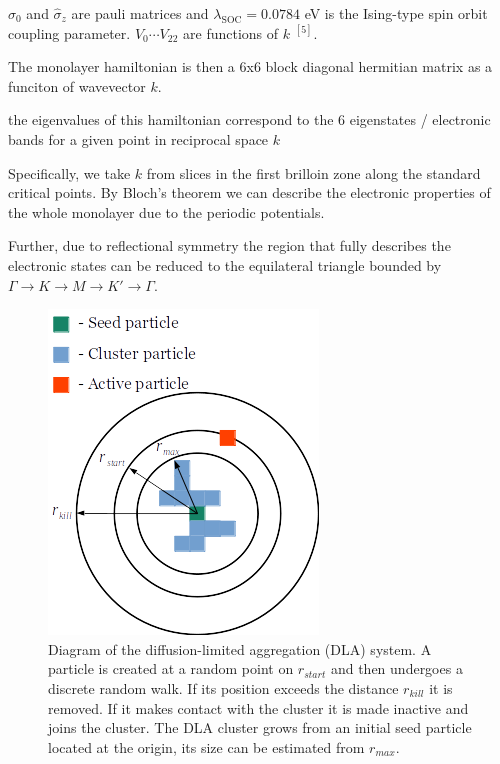 \documentclass[10pt, twocolumn]{article} %
\begin{document}
  \item $\hat{\sigma}_0$ and $\hat{\sigma}_z$ are pauli matrices and $\lambda_{\text{SOC}}=0.0784$ eV is the Ising-type spin orbit coupling parameter. $V_0 \cdots V_{22}$ are functions of $k$ $^{[5]}$.

    The monolayer hamiltonian is then a 6x6 block diagonal hermitian matrix as a funciton of wavevector $k$.

    the eigenvalues of this hamiltonian correspond to the 6 eigenstates / electronic bands for a given point in reciprocal space $k$ 

  Specifically, we take $k$ from slices in the first brilloin zone along the standard critical points. By Bloch's theorem we can describe the electronic properties of the whole monolayer due to the periodic potentials.

  Further, due to reflectional symmetry the region that fully describes the electronic states can be reduced to the equilateral triangle bounded by $\Gamma \rightarrow K \rightarrow M \rightarrow K' \rightarrow \Gamma$.

\begin{figure}[t]
\centering
\includegraphics[width=0.95\columnwidth]{DLA_diagram.png}
  \caption{
    Diagram of the diffusion-limited aggregation (DLA) system. A particle is created at a random point on $r_{start}$ and then undergoes a discrete random walk. If its position exceeds the distance $r_{kill}$ it is removed. If it makes contact with the cluster it is made inactive and joins the cluster. The DLA cluster grows from an initial seed particle located at the origin, its size can be estimated from $r_{max}$.
  }
  \label{DLA_diagram}
\end{figure}
\end{document}
